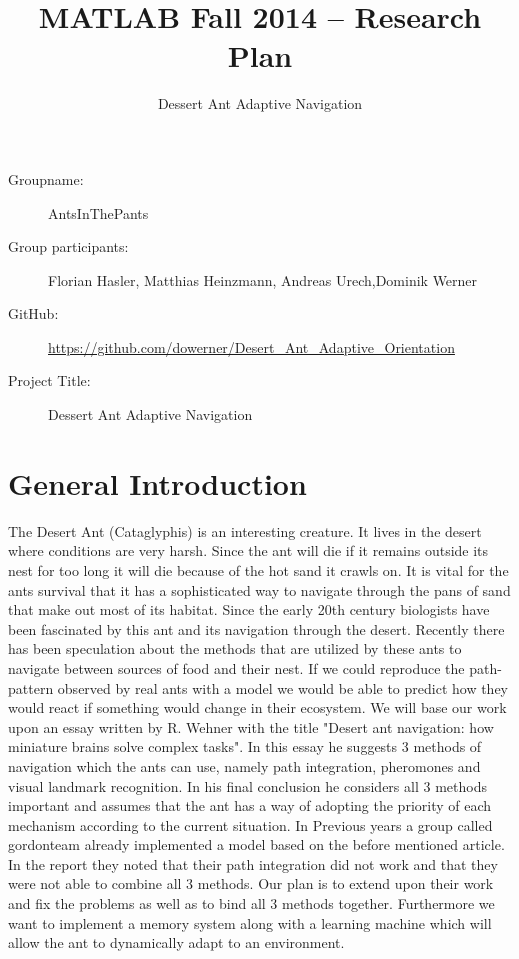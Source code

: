 \documentclass[11pt,a4paper]{scrartcl}
\title{MATLAB Fall 2014 – Research Plan}
\date{}
\author{Dessert Ant Adaptive Navigation}
\begin{document}
\maketitle
\begin{description}
\item[Groupname:] AntsInThePants
\item [Group participants:] Florian Hasler, Matthias Heinzmann, Andreas Urech,Dominik Werner
\item [GitHub: ] \url{ https://github.com/dowerner/Desert_Ant_Adaptive_Orientation}
\item[Project Title:] Dessert Ant Adaptive Navigation
\end{description}
\section*{General Introduction}
The Desert Ant (Cataglyphis) is an interesting creature. It lives in the desert where conditions are very harsh. Since the ant will die if it remains outside its nest for too long it will die because of the hot sand it crawls on. It is vital for the ants survival that it has a sophisticated way to navigate through the pans of sand that make out most of its habitat. Since the early 20th century biologists have been fascinated by this ant and its navigation through the desert. Recently there has been speculation about the methods that are utilized by these ants to navigate between sources of food and their nest. If we could reproduce the path-pattern observed by real ants with a model we would be able to predict how they would react if something would change in their ecosystem.
We will base our work upon an essay written by R. Wehner with the title "Desert ant navigation: how miniature brains solve complex tasks". In this essay he suggests 3 methods of navigation which the ants can use, namely path integration, pheromones and visual landmark recognition. In his final conclusion he considers all 3 methods important and assumes that the ant has a way of adopting the priority of each mechanism according to the current situation.
In Previous years a group called gordonteam already implemented a model based on the before mentioned article. In the report they noted that their path integration did not work and that they were not able to combine all 3 methods. Our plan is to extend upon their work and fix the problems as well as to bind all 3 methods together. Furthermore we want to implement a memory system along with a learning machine which will allow the ant to dynamically adapt to an environment.
\end{document}
